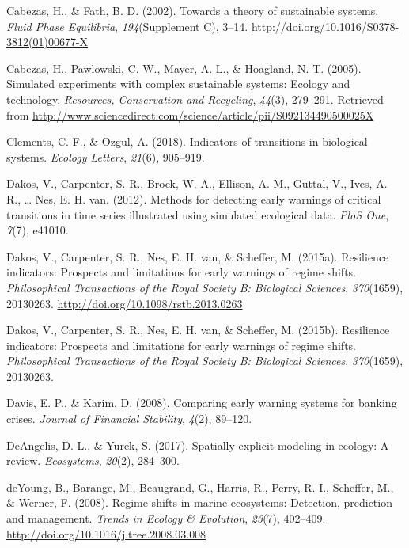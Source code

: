 \documentclass[12pt,twoside,openany]{reedthesis}
\begin{document}
\hypertarget{ref-cabezas_towards_2002}{}
Cabezas, H., \& Fath, B. D. (2002). Towards a theory of sustainable
systems. \emph{Fluid Phase Equilibria}, \emph{194}(Supplement C), 3--14.
\url{http://doi.org/10.1016/S0378-3812(01)00677-X}

\hypertarget{ref-cabezas_simulated_2005}{}
Cabezas, H., Pawlowski, C. W., Mayer, A. L., \& Hoagland, N. T. (2005).
Simulated experiments with complex sustainable systems: Ecology and
technology. \emph{Resources, Conservation and Recycling}, \emph{44}(3),
279--291. Retrieved from
\url{http://www.sciencedirect.com/science/article/pii/S092134490500025X}

\hypertarget{ref-clements2018indicators}{}
Clements, C. F., \& Ozgul, A. (2018). Indicators of transitions in
biological systems. \emph{Ecology Letters}, \emph{21}(6), 905--919.

\hypertarget{ref-dakos_methods_2012}{}
Dakos, V., Carpenter, S. R., Brock, W. A., Ellison, A. M., Guttal, V.,
Ives, A. R., \ldots{} Nes, E. H. van. (2012). Methods for detecting
early warnings of critical transitions in time series illustrated using
simulated ecological data. \emph{PloS One}, \emph{7}(7), e41010.

\hypertarget{ref-dakos_resilience_2015}{}
Dakos, V., Carpenter, S. R., Nes, E. H. van, \& Scheffer, M. (2015a).
Resilience indicators: Prospects and limitations for early warnings of
regime shifts. \emph{Philosophical Transactions of the Royal Society B:
Biological Sciences}, \emph{370}(1659), 20130263.
\url{http://doi.org/10.1098/rstb.2013.0263}

\hypertarget{ref-dakos2015resilience}{}
Dakos, V., Carpenter, S. R., Nes, E. H. van, \& Scheffer, M. (2015b).
Resilience indicators: Prospects and limitations for early warnings of
regime shifts. \emph{Philosophical Transactions of the Royal Society B:
Biological Sciences}, \emph{370}(1659), 20130263.

\hypertarget{ref-davis_comparing_2008}{}
Davis, E. P., \& Karim, D. (2008). Comparing early warning systems for
banking crises. \emph{Journal of Financial Stability}, \emph{4}(2),
89--120.

\hypertarget{ref-deangelis2017spatially}{}
DeAngelis, D. L., \& Yurek, S. (2017). Spatially explicit modeling in
ecology: A review. \emph{Ecosystems}, \emph{20}(2), 284--300.

\hypertarget{ref-deyoung_regime_2008}{}
deYoung, B., Barange, M., Beaugrand, G., Harris, R., Perry, R. I.,
Scheffer, M., \& Werner, F. (2008). Regime shifts in marine ecosystems:
Detection, prediction and management. \emph{Trends in Ecology \&
Evolution}, \emph{23}(7), 402--409.
\url{http://doi.org/10.1016/j.tree.2008.03.008}
\end{document}
